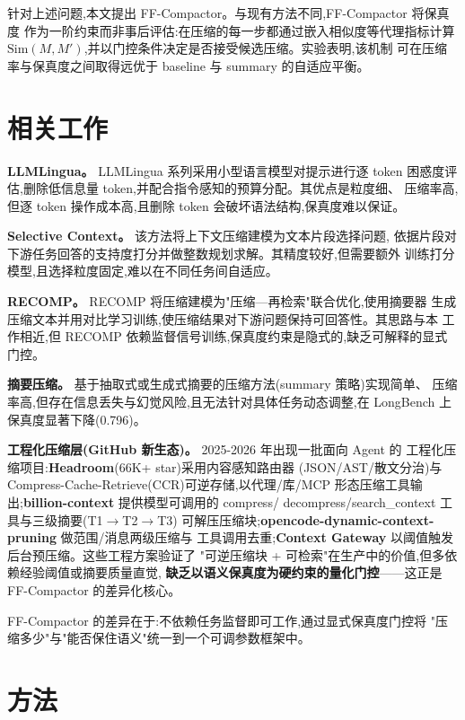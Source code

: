 \documentclass[11pt,a4paper]{article}
\begin{document}
针对上述问题,本文提出 FF-Compactor。与现有方法不同,FF-Compactor 将保真度
作为一阶约束而非事后评估:在压缩的每一步都通过嵌入相似度等代理指标计算
$\mathrm{Sim}(M, M')$,并以门控条件决定是否接受候选压缩。实验表明,该机制
可在压缩率与保真度之间取得远优于 baseline 与 summary 的自适应平衡。

\section{相关工作}

\textbf{LLMLingua。} LLMLingua 系列采用小型语言模型对提示进行逐 token
困惑度评估,删除低信息量 token,并配合指令感知的预算分配。其优点是粒度细、
压缩率高,但逐 token 操作成本高,且删除 token 会破坏语法结构,保真度难以保证。

\textbf{Selective Context。} 该方法将上下文压缩建模为文本片段选择问题,
依据片段对下游任务回答的支持度打分并做整数规划求解。其精度较好,但需要额外
训练打分模型,且选择粒度固定,难以在不同任务间自适应。

\textbf{RECOMP。} RECOMP 将压缩建模为"压缩—再检索"联合优化,使用摘要器
生成压缩文本并用对比学习训练,使压缩结果对下游问题保持可回答性。其思路与本
工作相近,但 RECOMP 依赖监督信号训练,保真度约束是隐式的,缺乏可解释的显式门控。

\textbf{摘要压缩。} 基于抽取式或生成式摘要的压缩方法(summary 策略)实现简单、
压缩率高,但存在信息丢失与幻觉风险,且无法针对具体任务动态调整,在 LongBench
上保真度显著下降(0.796)。

\textbf{工程化压缩层(GitHub 新生态)。} 2025-2026 年出现一批面向 Agent 的
工程化压缩项目:\textbf{Headroom}(66K+ star)采用内容感知路由器
(JSON/AST/散文分治)与 Compress-Cache-Retrieve(CCR)可逆存储,以代理/库/MCP
形态压缩工具输出;\textbf{billion-context} 提供模型可调用的 compress/
decompress/search\_context 工具与三级摘要(T1$\rightarrow$T2$\rightarrow$T3)
可解压压缩块;\textbf{opencode-dynamic-context-pruning} 做范围/消息两级压缩与
工具调用去重;\textbf{Context Gateway} 以阈值触发后台预压缩。这些工程方案验证了
"可逆压缩块 + 可检索"在生产中的价值,但多依赖经验阈值或摘要质量直觉,
\textbf{缺乏以语义保真度为硬约束的量化门控}——这正是 FF-Compactor 的差异化核心。

FF-Compactor 的差异在于:不依赖任务监督即可工作,通过显式保真度门控将
"压缩多少"与"能否保住语义"统一到一个可调参数框架中。

\section{方法}
\end{document}
